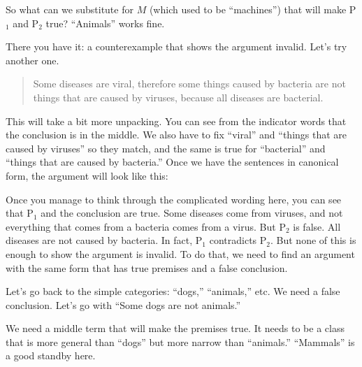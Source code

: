 So what can we substitute for $M$ (which used to be ``machines'') that will make P$_1$ and P$_2$ true? ``Animals'' works fine.

\begin{kormanize}
 \end{kormanize}

There you have it: a counterexample that shows the argument invalid. Let's try another one.

\begin{quotation}
Some diseases are viral, therefore some things caused by bacteria are not things that are caused by viruses, because all diseases are bacterial.
\end{quotation}

This will take a bit more unpacking. You can see from the indicator words that the conclusion is in the middle. We also have to fix ``viral'' and ``things that are caused by viruses'' so they match, and the same is true for ``bacterial'' and ``things that are caused by bacteria.'' Once we have the sentences in canonical form, the argument will look like this:

\begin{kormanize}
\end{kormanize}

Once you manage to think through the complicated wording here, you can see that P$_1$ and the conclusion are true. Some diseases come from viruses, and not everything that comes from a bacteria comes from a virus. But P$_2$ is false. All diseases are not caused by bacteria. In fact, P$_1$ contradicts P$_2$. But none of this is enough to show the argument is invalid. To do that, we need to find an argument with the same form that has true premises and a false conclusion.

Let's go back to the simple categories: ``dogs,'' ``animals,'' etc. We need a false conclusion. Let's go with ``Some dogs are not animals.''

\begin{kormanize}
 \end{kormanize}

We need a middle term that will make the premises true. It needs to be a class that is more general than ``dogs'' but more narrow than ``animals.'' ``Mammals'' is a good standby here.

